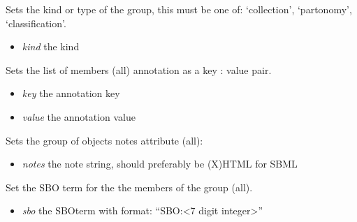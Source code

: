 \documentclass[a4paper,11pt,english]{sphinxmanual}
\begin{document}
\begin{fulllineitems}
\begin{fulllineitems}
\end{fulllineitems}


\begin{fulllineitems}
\label{modules_doc:cbmpy.CBModel.Group.setKind}
Sets the kind or type of the group, this must be one of: `collection', `partonomy', `classification'.
\begin{itemize}
\item {} 
\emph{kind} the kind

\end{itemize}

\end{fulllineitems}


\begin{fulllineitems}
\label{modules_doc:cbmpy.CBModel.Group.setSharedAnnotation}
Sets the list of members (all) annotation as a key : value pair.
\begin{itemize}
\item {} 
\emph{key} the annotation key

\item {} 
\emph{value} the annotation value

\end{itemize}

\end{fulllineitems}


\begin{fulllineitems}
\label{modules_doc:cbmpy.CBModel.Group.setSharedNotes}
Sets the group of objects notes attribute (all):
\begin{itemize}
\item {} 
\emph{notes} the note string, should preferably be (X)HTML for SBML

\end{itemize}

\end{fulllineitems}


\begin{fulllineitems}
\label{modules_doc:cbmpy.CBModel.Group.setSharedSBOterm}
Set the SBO term for the the members of the group (all).
\begin{itemize}
\item {} 
\emph{sbo} the SBOterm with format: ``SBO:\textless{}7 digit integer\textgreater{}''


\end{itemize}
\end{fulllineitems}
\end{fulllineitems}
\end{document}
